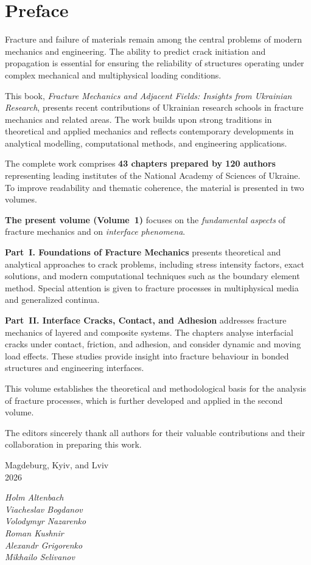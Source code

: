 \chapter*{Preface}

Fracture and failure of materials remain among the central problems of modern
mechanics and engineering. The ability to predict crack initiation and
propagation is essential for ensuring the reliability of structures operating
under complex mechanical and multiphysical loading conditions.

This book, \emph{Fracture Mechanics and Adjacent Fields: Insights from Ukrainian Research},
presents recent contributions of Ukrainian research schools in fracture
mechanics and related areas. The work builds upon strong traditions in
theoretical and applied mechanics and reflects contemporary developments in
analytical modelling, computational methods, and engineering applications.

The complete work comprises \textbf{43 chapters prepared by 120 authors}
representing leading institutes of the National Academy of Sciences of Ukraine.
To improve readability and thematic coherence, the material is presented in two
volumes.

\medskip
\textbf{The present volume (Volume~1)} focuses on the \emph{fundamental aspects}
of fracture mechanics and on \emph{interface phenomena}.

\medskip
\textbf{Part~I. Foundations of Fracture Mechanics} presents theoretical and
analytical approaches to crack problems, including stress intensity factors,
exact solutions, and modern computational techniques such as the boundary
element method. Special attention is given to fracture processes in
multiphysical media and generalized continua.

\medskip
\textbf{Part~II. Interface Cracks, Contact, and Adhesion} addresses fracture
mechanics of layered and composite systems. The chapters analyse interfacial
cracks under contact, friction, and adhesion, and consider dynamic and moving
load effects. These studies provide insight into fracture behaviour in bonded
structures and engineering interfaces.

\medskip
This volume establishes the theoretical and methodological basis for the
analysis of fracture processes, which is further developed and applied in the
second volume.

\medskip
The editors sincerely thank all authors for their valuable contributions and
their collaboration in preparing this work.

\bigskip
\noindent
Magdeburg, Kyiv, and Lviv \\
2026

\medskip
\noindent
\textit{Holm Altenbach}\\
\textit{Viacheslav Bogdanov}\\
\textit{Volodymyr Nazarenko}\\
\textit{Roman Kushnir}\\
\textit{Alexandr Grigorenko}\\
\textit{Mikhailo Selivanov}